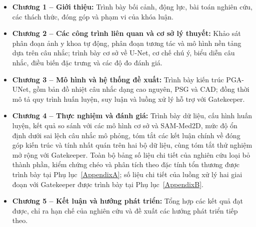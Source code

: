 \begin{itemize}
    \item \textbf{Chương 1 -- Giới thiệu:}
    Trình bày bối cảnh, động lực, bài toán nghiên cứu, các thách thức, đóng góp và phạm vi của khóa luận.

    \item \textbf{Chương 2 -- Các công trình liên quan và cơ sở lý thuyết:}
    Khảo sát phân đoạn ảnh y khoa tự động, phân đoạn tương tác và mô hình nền tảng dựa trên câu nhắc; trình bày cơ sở về U-Net, cơ chế chú ý, biểu diễn câu nhắc, điều biến đặc trưng và các độ đo đánh giá.

    \item \textbf{Chương 3 -- Mô hình và hệ thống đề xuất:}
    Trình bày kiến trúc PGA-UNet, gồm bản đồ nhiệt câu nhắc dạng cao nguyên, PSG và CAD; đồng thời mô tả quy trình huấn luyện, suy luận và luồng xử lý hỗ trợ với Gatekeeper.

    \item \textbf{Chương 4 -- Thực nghiệm và đánh giá:}
    Trình bày dữ liệu, cấu hình huấn luyện, kết quả so sánh với các mô hình cơ sở và SAM-Med2D, mức độ ổn định dưới sai lệch câu nhắc mô phỏng, tóm tắt các kết luận chính về đóng góp kiến trúc và tính nhất quán trên hai bộ dữ liệu, cùng tóm tắt thử nghiệm mở rộng với Gatekeeper. Toàn bộ bảng số liệu chi tiết của nghiên cứu loại bỏ thành phần, kiểm chứng chéo và phân tích theo đặc tính tổn thương được trình bày tại Phụ lục~\ref{AppendixA}; số liệu chi tiết của luồng xử lý hai giai đoạn với Gatekeeper được trình bày tại Phụ lục~\ref{AppendixB}.

    \item \textbf{Chương 5 -- Kết luận và hướng phát triển:}
    Tổng hợp các kết quả đạt được, chỉ ra hạn chế của nghiên cứu và đề xuất các hướng phát triển tiếp theo.
\end{itemize}
